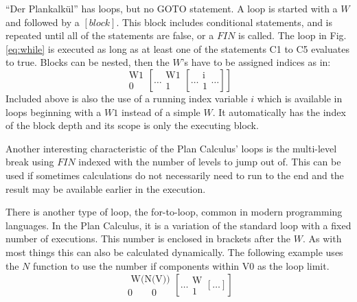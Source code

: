 \documentclass{llncs}
\begin{document}
   ``Der Plankalkül'' has loops, but no GOTO statement. A loop is started with a $W$ and followed
   by a $[block]$. This block includes conditional statements, and is repeated until all of the 
   statements are false, or a $FIN$ is called. The loop in Fig. \ref{eq:while} is executed as long 
   as at least one of the statements C1 to C5 evaluates to true. Blocks can be nested, then the $W$'s 
   have to be assigned indices as in:
   \begin{equation*}
     \begin{matrix}\text{W1}\\0\end{matrix}\left[ \dots 
     \begin{matrix}\text{W1}\\1\end{matrix} \left[ \dots 
     \begin{matrix}\text{i}\\1\end{matrix} \dots \right ] \right ]
     \label{eq:nestedWhile}
   \end{equation*}
   Included above is also the use of a running index variable $i$ which is available in loops beginning 
   with a $W1$ instead of a simple $W$. It automatically has the index of the block depth and its 
   scope is only the executing block. 
   
   Another interesting characteristic of the Plan Calculus' 
   loops is the multi-level break using $FIN$ indexed with the number of levels to jump out of. 
   This can be used if sometimes calculations do not necessarily need to run to the end and the result 
   may be available earlier in the execution\cite{zuse1948allgemeinen}. 
   
   There is another type of loop, the for-to-loop, common in modern programming languages. In the Plan 
   Calculus, it is a variation of the standard loop with a fixed number of executions. This number is 
   enclosed in brackets after the $W$. As with most things this can also be calculated dynamically. 
   The following example uses the $N$ function to use the number if components within V0 as the 
   loop limit.
   \begin{equation*}
     \begin{matrix}\text{  W(N(V))}\\0\qquad0\end{matrix}\left[ \dots 
     \begin{matrix}\text{W}\\1\end{matrix} \left[ \dots \right ] \right ]
     \label{eq:forto}
   \end{equation*}
\end{document}
